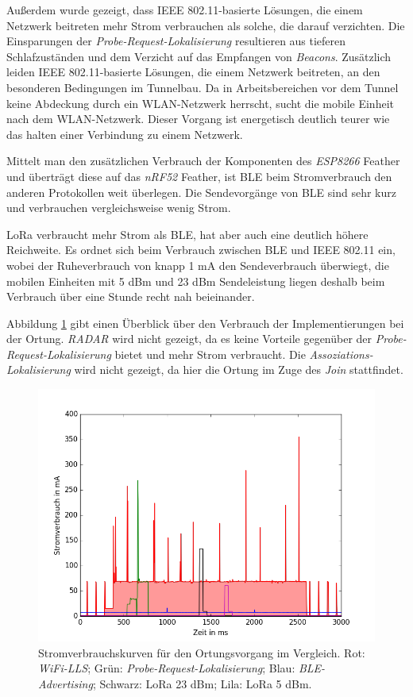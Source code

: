 Außerdem wurde gezeigt, dass IEEE 802.11-basierte Lösungen, die einem Netzwerk beitreten mehr Strom verbrauchen als solche, die darauf verzichten.
Die Einsparungen der \emph{Probe-Request-Lokalisierung} resultieren aus tieferen Schlafzuständen und dem Verzicht auf das Empfangen von \emph{Beacons}.
Zusätzlich leiden IEEE 802.11-basierte Lösungen, die einem Netzwerk beitreten, an den besonderen Bedingungen im Tunnelbau.
Da in Arbeitsbereichen vor dem Tunnel keine Abdeckung durch ein WLAN-Netzwerk herrscht, sucht die mobile Einheit nach dem WLAN-Netzwerk.
Dieser Vorgang ist energetisch deutlich teurer wie das halten einer Verbindung zu einem Netzwerk.

Mittelt man den zusätzlichen Verbrauch der Komponenten des \emph{ESP8266} Feather und überträgt diese auf das \emph{nRF52} Feather, ist BLE beim Stromverbrauch den anderen Protokollen weit überlegen.
Die Sendevorgänge von BLE sind sehr kurz und verbrauchen vergleichsweise wenig Strom.

LoRa verbraucht mehr Strom als BLE, hat aber auch eine deutlich höhere Reichweite.
Es ordnet sich beim Verbrauch zwischen BLE und IEEE 802.11 ein, wobei der Ruheverbrauch von knapp 1 mA den Sendeverbrauch überwiegt, die mobilen Einheiten mit 5 dBm und 23 dBm Sendeleistung liegen deshalb beim Verbrauch über eine Stunde recht nah beieinander.

Abbildung \ref{fig:alle} gibt einen Überblick über den Verbrauch der Implementierungen bei der Ortung. 
\emph{RADAR} wird nicht gezeigt, da es keine Vorteile gegenüber der \emph{Probe-Request-Lokalisierung} bietet und mehr Strom verbraucht.
Die \emph{Assoziations-Lokalisierung} wird nicht gezeigt, da hier die Ortung im Zuge des \emph{Join} stattfindet.

\begin{figure}[h!]
  \centering
	\includegraphics[width=\textwidth]{plots/alle.png}
  \caption{Stromverbrauchskurven für den Ortungsvorgang im Vergleich. Rot: \emph{WiFi-LLS}; Grün: \emph{Probe-Request-Lokalisierung}; Blau: \emph{BLE-Advertising}; Schwarz: LoRa 23 dBm; Lila: LoRa 5 dBm.}
  \label{fig:alle}
\end{figure}


